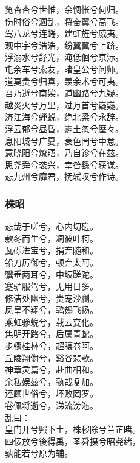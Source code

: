 \documentclass[]{article}
\begin{document}
览杳杳兮世惟，余惆怅兮何归。\\
伤时俗兮溷乱，将奋翼兮高飞。\\
驾八龙兮连蜷，建虹旌兮威夷。\\
观中宇兮浩浩，纷翼翼兮上跻。\\
浮溺水兮舒光，淹低佪兮京沶。\\
屯余车兮索友，睹皇公兮问师。\\
道莫贵兮归真，羡余术兮可夷。\\
吾乃逝兮南娭，道幽路兮九疑。\\
越炎火兮万里，过万首兮嶷嶷。\\
济江海兮蝉蜕，绝北梁兮永辞。\\
浮云郁兮昼昏，霾土忽兮塺々。\\
息阳城兮广夏，衰色罔兮中怠。\\
意晓阳兮燎寤，乃自诊兮在兹。\\
思尧舜兮袭兴，幸咎繇兮获谋。\\
悲九州兮靡君，抚轼叹兮作诗。

\hypertarget{header-n312}{%
\subsubsection{株昭}\label{header-n312}}

悲哉于嗟兮，心内切磋。\\
款冬而生兮，凋彼叶柯。\\
瓦砾进宝兮，捐弃随和。\\
铅刀厉御兮，顿弃太阿。\\
骥垂两耳兮，中坂蹉跎。\\
蹇驴服驾兮，无用日多。\\
修洁处幽兮，贵宠沙劘。\\
凤皇不翔兮，鹑鴳飞扬。\\
乘虹骖蜺兮，载云变化。\\
焦明开路兮，后属青蛇。\\
步骤桂林兮，超骧卷阿。\\
丘陵翔儛兮，谿谷悲歌。\\
神章灵篇兮，赴曲相和。\\
余私娱兹兮，孰哉复加。\\
还顾世俗兮，坏败罔罗。\\
卷佩将逝兮，涕流滂沲。\\
乱曰：\\
皇门开兮照下土，株秽除兮兰芷睹。\\
四佞放兮後得禹，圣舜摄兮昭尧绪，\\
孰能若兮原为辅。
\end{document}

